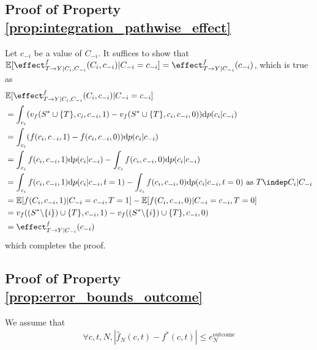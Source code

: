 \subsection{Proof of Property \ref{prop:integration_pathwise_effect}}
\label{proof:integration_pathwise_effect}
Let $c_{-i}$ be a value of $C_{-i}$. It suffices to show that $\mathbb{E}[\effect^f_{T \rightarrow Y | C_i, C_{-i}}(C_i,c_{-i}) | C_{-i} = c_{-i}] = \effect^f_{T \rightarrow Y | C_{-i}}(c_{-i})$, which is true as
\begin{align*}
    &\mathbb{E}[\effect^f_{T \rightarrow Y | C_i, C_{-i}}(C_i,c_{-i}) | C_{-i} = c_{-i}] \\
    &= \int_{c_i} (v_f(S^* \cup \{T\}, c_i, c_{-i}, 1) - v_f(S^* \cup \{T\}, c_i, c_{-i}, 0)) \text{d}p(c_i | c_{-i}) \\
    &= \int_{c_i} (f(c_i, c_{-i}, 1) - f(c_i, c_{-i}, 0)) \text{d}p(c_i | c_{-i}) \\
    &= \int_{c_i} f(c_i, c_{-i}, 1)\text{d}p(c_i | c_{-i}) - \int_{c_i}f(c_i, c_{-i}, 0) \text{d}p(c_i | c_{-i}) \\
    &= \int_{c_i} f(c_i, c_{-i}, 1)\text{d}p(c_i | c_{-i}, t=1) - \int_{c_i}f(c_i, c_{-i}, 0) \text{d}p(c_i | c_{-i}, t=0) \text{ as } T \indep C_i | C_{-i} \\
    &= \mathbb{E}[f(C_i, c_{-i}, 1) | C_{-i}=c_{-i}, T=1] - \mathbb{E}[f(C_i, c_{-i}, 0) | C_{-i}=c_{-i}, T=0] \\
    &= v_f((S^* \backslash \{i\}) \cup \{T\}, c_{-i}, 1) - v_f((S^* \backslash \{i\}) \cup \{T\}, c_{-i}, 0) \\
    &= \effect^f_{T \rightarrow Y | C_{-i}}(c_{-i})
\end{align*}
which completes the proof.



\subsection{Proof of Property \ref{prop:error_bounds_outcome}}
\label{proof:error_bounds_outcome}
We assume that
    \begin{align*}
    \forall c, t, N, | \hat{f}_N(c,t) - f^*(c,t) | \leq e^\text{outcome}_N
    \end{align*}

